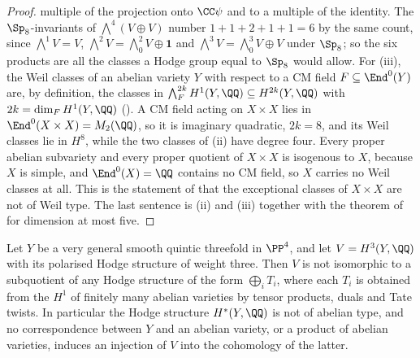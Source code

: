 \begin{proof}
multiple of the projection onto $\CC\psi$ and to a multiple of the
identity. The $\Sp_{8}$-invariants of $\bigwedge^{4}(V\oplus V)$ number
$1+1+2+1+1=6$ by the same count, since $\bigwedge^{1}V=V$,
$\bigwedge^{2}V=\bigwedge^{2}_{0}V\oplus\mathbf{1}$ and
$\bigwedge^{3}V=\bigwedge^{3}_{0}V\oplus V$ under $\Sp_{8}$; so the six
products are all the classes a Hodge group equal to $\Sp_{8}$ would allow. For (iii), the Weil classes of an abelian
variety $Y$ with respect to a CM field $F\subseteq\End^{0}(Y)$ are, by
definition, the classes in $\bigwedge^{2k}_{F}H^{1}(Y,\QQ)\subseteq
H^{2k}(Y,\QQ)$ with $2k=\dim_{F}H^{1}(Y,\QQ)$ (\cite[Setup~17.1]{paperI}). A CM
field acting on $X\times X$ lies in $\End^{0}(X\times X)=M_{2}(\QQ)$, so it is
imaginary quadratic, $2k=8$, and its Weil classes lie in $H^{8}$, while the two
classes of (ii) have degree four. Every proper
abelian subvariety and every proper quotient of $X\times X$ is isogenous to
$X$, because $X$ is simple, and $\End^{0}(X)=\QQ$ contains no CM field, so $X$
carries no Weil classes at all. This is the statement of \cite[0.1(iii)]{MZ99}
that the exceptional classes of $X\times X$ are not of Weil type. The last
sentence is (ii) and (iii) together with the theorem of \cite{MZ99} for
dimension at most five.
\end{proof}

\begin{proposition}
\label{prop:noabeliantype}
Let $Y$ be a very general smooth quintic threefold in $\PP^{4}$, and let
$V=H^{3}(Y,\QQ)$ with its polarised Hodge structure of weight three. Then $V$
is not isomorphic to a subquotient of any Hodge structure of the form
$\bigoplus_{i}T_{i}$, where each $T_{i}$ is obtained from the $H^{1}$ of
finitely many abelian varieties by tensor products, duals and Tate twists. In
particular the Hodge structure $H^{*}(Y,\QQ)$ is not of abelian type, and no
correspondence between $Y$ and an abelian variety, or a product of abelian
varieties, induces an injection of $V$ into the cohomology of the latter.
\end{proposition}

